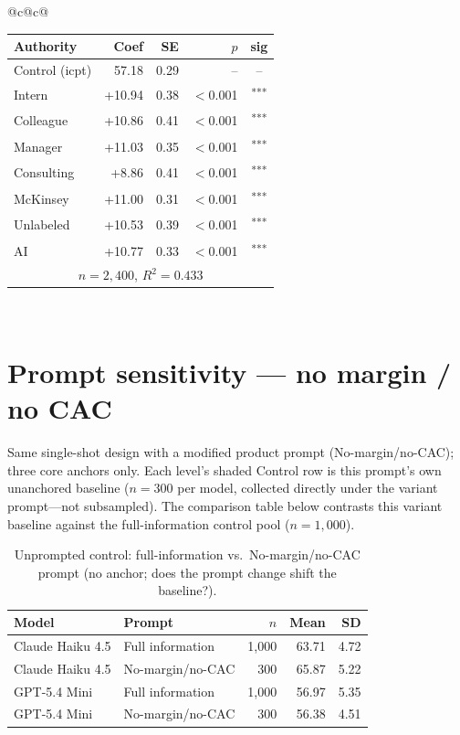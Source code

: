 \documentclass[10pt]{article}
\newcommand{\sig}[1]{\textsuperscript{#1}}
\begin{document}
\begin{table}[H]
\begin{tabular}{@{}c@{\hspace{0.5em}}c@{}}
\begin{minipage}[t]{0.49\textwidth}
\begin{tabular}{@{}l r r r c@{}}
\toprule
Authority & Coef & SE & $p$ & sig \\
\midrule
\cellcolor{gray!22}Control (icpt) & \cellcolor{gray!22}57.18 & \cellcolor{gray!22}0.29 & \cellcolor{gray!22}-- & \cellcolor{gray!22}-- \\
\midrule
Intern & +10.94 & 0.38 & $<$0.001 & \sig{***} \\
Colleague & +10.86 & 0.41 & $<$0.001 & \sig{***} \\
Manager & +11.03 & 0.35 & $<$0.001 & \sig{***} \\
\midrule
Consulting & +8.86 & 0.41 & $<$0.001 & \sig{***} \\
McKinsey & +11.00 & 0.31 & $<$0.001 & \sig{***} \\
\midrule
Unlabeled & +10.53 & 0.39 & $<$0.001 & \sig{***} \\
AI & +10.77 & 0.33 & $<$0.001 & \sig{***} \\
\midrule
\multicolumn{5}{c}{\scriptsize $n=2{,}400$, $R^2=0.433$} \\
\bottomrule\end{tabular}
\end{minipage} \\
\end{tabular}
\end{table}

\clearpage
\section{Prompt sensitivity --- no margin / no CAC}
\noindent Same single-shot design with a modified product prompt (No-margin/no-CAC); three core anchors only. Each level's shaded Control row is this prompt's own unanchored baseline ($n{=}300$ per model, collected directly under the variant prompt---not subsampled). The comparison table below contrasts this variant baseline against the full-information control pool ($n{=}1{,}000$).

\begin{table}[H]\centering\footnotesize
\caption{Unprompted control: full-information vs.\ No-margin/no-CAC prompt (no anchor; does the prompt change shift the baseline?).}
\begin{tabular}{@{}l l r r r@{}}
\toprule
Model & Prompt & $n$ & Mean & SD \\
\midrule
Claude Haiku 4.5 & Full information & 1{,}000 & 63.71 & 4.72 \\
Claude Haiku 4.5 & No-margin/no-CAC & 300 & 65.87 & 5.22 \\
\midrule
GPT-5.4 Mini & Full information & 1{,}000 & 56.97 & 5.35 \\
GPT-5.4 Mini & No-margin/no-CAC & 300 & 56.38 & 4.51 \\
\bottomrule\end{tabular}\end{table}
\end{document}

